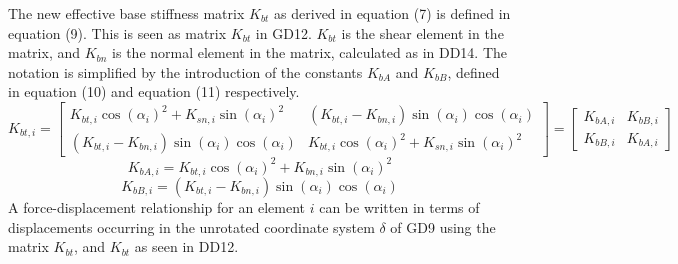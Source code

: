 \documentclass[12pt]{article}
\begin{document}
The new effective base stiffness matrix $K_{bt}$ as derived in equation (7) is defined in equation (9). This is seen as matrix $K_{bt}$ in GD12. $K_{bt}$ is the shear element in the matrix, and $K_{bn}$ is the normal element in the matrix, calculated as in DD14. The notation is simplified by the introduction of the constants $K_{bA}$ and $K_{bB}$, defined in equation (10) and equation (11) respectively.
\begin{equation}
K_{bt,i}=\begin{bmatrix}
K_{bt,i}\cos\left(\alpha{}_{i}\right)^{2}+K_{sn,i}\sin\left(\alpha{}_{i}\right)^{2} & \left(K_{bt,i}-K_{bn,i}\right)\sin\left(\alpha{}_{i}\right)\cos\left(\alpha{}_{i}\right)\\
\left(K_{bt,i}-K_{bn,i}\right)\sin\left(\alpha{}_{i}\right)\cos\left(\alpha{}_{i}\right) & K_{bt,i}\cos\left(\alpha{}_{i}\right)^{2}+K_{sn,i}\sin\left(\alpha{}_{i}\right)^{2}
\end{bmatrix}=\begin{bmatrix}
K_{bA,i} & K_{bB,i}\\
K_{bB,i} & K_{bA,i}
\end{bmatrix}
\end{equation}
\begin{equation}
K_{bA,i}=K_{bt,i}\cos\left(\alpha{}_{i}\right)^{2}+K_{bn,i}\sin\left(\alpha{}_{i}\right)^{2}
\end{equation}
\begin{equation}
K_{bB,i}=\left(K_{bt,i}-K_{bn,i}\right)\sin\left(\alpha{}_{i}\right)\cos\left(\alpha{}_{i}\right)
\end{equation}
A force-displacement relationship for an element $i$ can be written in terms of displacements occurring in the unrotated coordinate system $\delta{}$ of GD9 using the matrix $K_{bt}$, and $K_{bt}$ as seen in DD12.
~\newline
\end{document}
